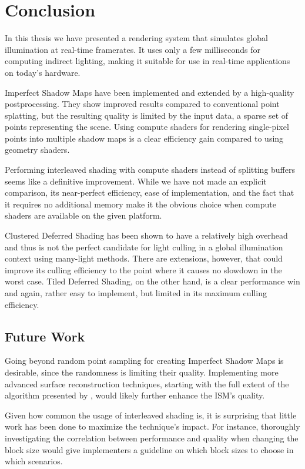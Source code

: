 

\chapter{Conclusion}
\label{chap:conclusion}

In this thesis we have presented a rendering system that simulates global illumination at real-time framerates. It uses only a few milliseconds for computing indirect lighting, making it suitable for use in real-time applications on today's hardware.

Imperfect Shadow Maps have been implemented and extended by a high-quality postprocessing. They show improved results compared to conventional point splatting, but the resulting quality is limited by the input data, a sparse set of points representing the scene. Using compute shaders for rendering single-pixel points into multiple shadow maps is a clear efficiency gain compared to using geometry shaders.

Performing interleaved shading with compute shaders instead of splitting buffers seems like a definitive improvement. While we have not made an explicit comparison, its near-perfect efficiency, ease of implementation, and the fact that it requires no additional memory make it the obvious choice when compute shaders are available on the given platform.

Clustered Deferred Shading has been shown to have a relatively high overhead and thus is not the perfect candidate for light culling in a global illumination context using many-light methods. There are extensions, however, that could improve its culling efficiency to the point where it causes no slowdown in the worst case. Tiled Deferred Shading, on the other hand, is a clear performance win and again, rather easy to implement, but limited in its maximum culling efficiency.

\section{Future Work}

Going beyond random point sampling for creating Imperfect Shadow Maps is desirable, since the randomness is limiting their quality. Implementing more advanced surface reconstruction techniques, starting with the full extent of the algorithm presented by \citet{Marroquim:2007:reconstruction}, would likely further enhance the ISM's quality.

Given how common the usage of interleaved shading is, it is surprising that little work has been done to maximize the technique's impact. For instance, thoroughly investigating the correlation between performance and quality when changing the block size would give implementers a guideline on which block sizes to choose in which scenarios.

